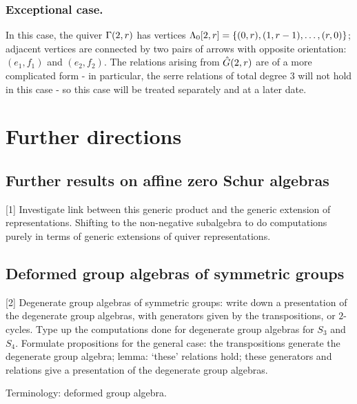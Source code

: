 \documentclass[a4paper, 11pt]{report}
\begin{document}
\subsection{Exceptional case.}

In this case, the quiver $\presentationquiver[2,r]$ has vertices $\compositions[2,r]=\{(0,r), (1,r-1),\ldots, (r,0)\}$; adjacent vertices are connected by two pairs of arrows with opposite orientation: $(e_1,f_1)$ and $(e_2,f_2)$. The relations arising from $\generic[2,r]$ are of a more complicated form - in particular, the serre relations of total degree $3$ will not hold in this case - so this case will be treated separately and at a later date.

\chapter{Further directions}

\section{Further results on affine zero Schur algebras}

[1] Investigate link between this generic product and the generic extension of representations. Shifting to the non-negative subalgebra to do computations purely in terms of generic extensions of quiver representations.

\section{Deformed group algebras of symmetric groups}

[2] Degenerate group algebras of symmetric groups: write down a presentation of the degenerate group algebras, with generators given by the transpositions, or $2$-cycles. Type up the computations done for degenerate group algebras for $S_3$ and $S_4$. Formulate propositions for the general case: the transpositions generate the degenerate group algebra; lemma: `these' relations hold; these generators and relations give a presentation of the degenerate group algebras.

Terminology: deformed group algebra.


\printbibliography
\end{document}
